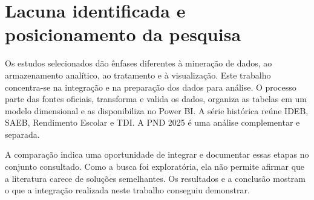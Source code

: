 \section{Lacuna identificada e posicionamento da pesquisa}

Os estudos selecionados dão ênfases diferentes à mineração de dados, ao armazenamento analítico, ao tratamento e à visualização. Este trabalho concentra-se na integração e na preparação dos dados para análise. O processo parte das fontes oficiais, transforma e valida os dados, organiza as tabelas em um modelo dimensional e as disponibiliza no Power BI. A série histórica reúne IDEB, SAEB, Rendimento Escolar e TDI. A PND 2025 é uma análise complementar e separada.

A comparação indica uma oportunidade de integrar e documentar essas etapas no conjunto consultado. Como a busca foi exploratória, ela não permite afirmar que a literatura carece de soluções semelhantes. Os resultados e a conclusão mostram o que a integração realizada neste trabalho conseguiu demonstrar.
